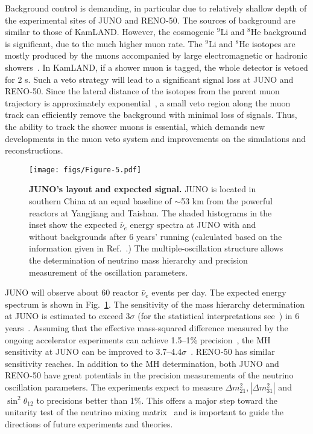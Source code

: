 \documentclass[aps,twocolumn,preprintnumbers,amsmath,superscriptaddress,amssymb,floats,nofootinbib]{revtex4-1}
\begin{document}
Background control is demanding, in particular due to relatively shallow depth of the experimental sites of JUNO and RENO-50. 
The sources of background are similar to those of KamLAND. 
However, the cosmogenic $^9$Li and $^8$He background is significant, due to the much higher muon rate. 
The $^9$Li and $^8$He isotopes are mostly produced by the muons accompanied by large electromagnetic or hadronic showers~\cite{KamLAND-spall}. In KamLAND, if a shower muon is tagged, the whole detector is vetoed for 2 s. Such a veto strategy will lead to a significant signal loss at JUNO and RENO-50. 
Since the lateral distance of the isotopes from the parent muon trajectory is approximately exponential~\cite{KamLAND-spall}, a small veto region along the muon track can efficiently remove the background with minimal loss of signals. Thus, the ability to track the shower muons is essential, which demands new developments in the muon veto system and improvements on the simulations and reconstructions.

\begin{figure}[tb] 
  \centering
  \texttt{[image: figs/Figure-5.pdf]}
  \caption{{\bf JUNO's layout and expected signal.} JUNO is located in southern China at an equal baseline of $\sim$53 km from the powerful reactors at Yangjiang and Taishan. The shaded histograms in the inset show the expected $\bar\nu_e$ energy spectra at JUNO with and without backgrounds after 6 years' running (calculated based on the information given in Ref.~\cite{He-Now2014}.) The multiple-oscillation structure allows the determination of neutrino mass hierarchy and precision measurement of the oscillation parameters.}
  \label{fig:juno}
\end{figure}

JUNO will observe about 60 reactor $\bar\nu_e$ events per day. The expected energy spectrum is shown in Fig.~\ref{fig:juno}.
The sensitivity of the mass hierarchy determination at JUNO is estimated to exceed 3$\sigma$ (for the statistical interpretations see~\cite{Qian-Stat,Blennow}) in 6 years~\cite{Li-PRD13,MBRwitepaper}. 
Assuming that the effective mass-squared difference measured by the ongoing accelerator experiments can achieve 1.5--1\% precision~\cite{Agarwalla}, the MH sensitivity at JUNO can be improved to 3.7--4.4$\sigma$~\cite{Li-PRD13}. 
RENO-50 has similar sensitivity reaches.
In addition to the MH determination, both JUNO and RENO-50 have great potentials in the precision measurements of the neutrino oscillation parameters. The experiments expect to measure $\Delta m^2_{21}, |\Delta m^2_{31}|$ and $\sin^2 \theta_{12}$ to precisions better than 1\%. This offers a major step toward the unitarity test of the neutrino mixing matrix~\cite{unitarity13} and is important to guide the directions of future experiments and theories. 
\end{document}
